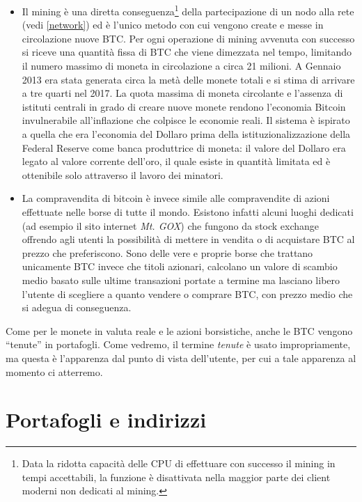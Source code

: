 \begin{itemize}
\item
  Il mining è una diretta conseguenza\footnote{Data la ridotta capacità delle CPU di effettuare con successo il mining in tempi accettabili, la funzione è disattivata nella maggior parte dei client moderni non dedicati al mining.} della partecipazione di un nodo   alla rete (vedi \ref{network}) ed è l'unico metodo con cui   vengono create e messe in circolazione nuove BTC. Per ogni   operazione di mining avvenuta con successo si riceve una quantità   fissa di BTC che viene dimezzata nel tempo, limitando il numero   massimo di moneta in circolazione a circa 21 milioni. A Gennaio 2013 era stata generata circa la metà delle monete totali e si stima di   arrivare a tre quarti nel 2017. La quota massima di moneta circolante e   l'assenza di istituti centrali in grado di creare nuove monete rendono   l'economia Bitcoin invulnerabile all'inflazione che colpisce le   economie reali. Il sistema è ispirato a quella che era l'economia del   Dollaro prima della istituzionalizzazione della Federal Reserve come   banca produttrice di moneta: il valore del Dollaro era legato al valore corrente   dell'oro, il quale esiste in quantità limitata ed è ottenibile solo   attraverso il lavoro dei minatori.
\item
  La compravendita di bitcoin è invece simile alle compravendite di   azioni effettuate nelle borse di tutte il mondo. Esistono infatti   alcuni luoghi dedicati (ad esempio il sito internet \emph{Mt. GOX})   che fungono da stock exchange offrendo agli utenti la possibilità di   mettere in vendita o di acquistare BTC al prezzo che preferiscono.   Sono delle vere e proprie borse che trattano unicamente BTC invece   che titoli azionari, calcolano un valore di scambio   medio basato sulle ultime transazioni portate a termine ma lasciano   libero l'utente di scegliere a quanto vendere o comprare BTC, con   prezzo medio che si adegua di conseguenza.
\end{itemize}

Come per le monete in valuta reale e le azioni borsistiche, anche le BTC vengono ``tenute'' in portafogli. Come vedremo, il termine \emph{tenute} è usato impropriamente, ma questa è l'apparenza dal punto di vista dell'utente, per cui a tale apparenza al momento ci atterremo.

\section{Portafogli e indirizzi}\label{portafogli-e-indirizzi}

